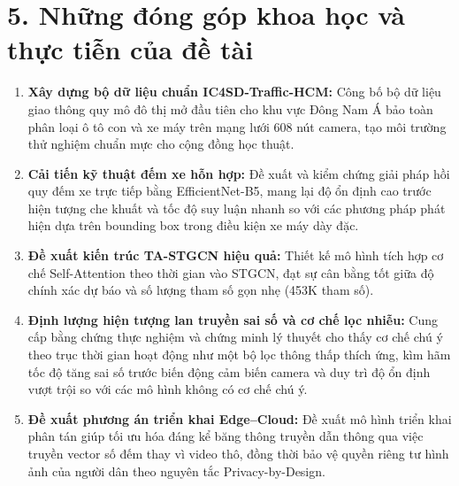 \section*{5. Những đóng góp khoa học và thực tiễn của đề tài}
\begin{enumerate}
    \item \textbf{Xây dựng bộ dữ liệu chuẩn IC4SD-Traffic-HCM:} Công bố bộ dữ liệu giao thông quy mô đô thị mở đầu tiên cho khu vực Đông Nam Á bảo toàn phân loại ô tô con và xe máy trên mạng lưới 608 nút camera, tạo môi trường thử nghiệm chuẩn mực cho cộng đồng học thuật.
    \item \textbf{Cải tiến kỹ thuật đếm xe hỗn hợp:} Đề xuất và kiểm chứng giải pháp hồi quy đếm xe trực tiếp bằng EfficientNet-B5, mang lại độ ổn định cao trước hiện tượng che khuất và tốc độ suy luận nhanh so với các phương pháp phát hiện dựa trên bounding box trong điều kiện xe máy dày đặc.
    \item \textbf{Đề xuất kiến trúc TA-STGCN hiệu quả:} Thiết kế mô hình tích hợp cơ chế Self-Attention theo thời gian vào STGCN, đạt sự cân bằng tốt giữa độ chính xác dự báo và số lượng tham số gọn nhẹ (453K tham số).
    \item \textbf{Định lượng hiện tượng lan truyền sai số và cơ chế lọc nhiễu:} Cung cấp bằng chứng thực nghiệm và chứng minh lý thuyết cho thấy cơ chế chú ý theo trục thời gian hoạt động như một bộ lọc thông thấp thích ứng, kìm hãm tốc độ tăng sai số trước biến động cảm biến camera và duy trì độ ổn định vượt trội so với các mô hình không có cơ chế chú ý.
    \item \textbf{Đề xuất phương án triển khai Edge--Cloud:} Đề xuất mô hình triển khai phân tán giúp tối ưu hóa đáng kể băng thông truyền dẫn thông qua việc truyền vector số đếm thay vì video thô, đồng thời bảo vệ quyền riêng tư hình ảnh của người dân theo nguyên tắc Privacy-by-Design.
\end{enumerate}

